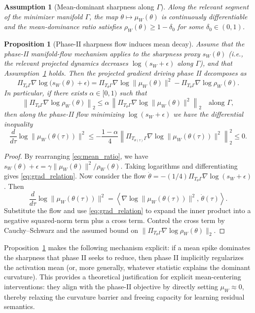 \documentclass[11pt]{article}
\newtheorem{assumption}{Assumption}
\newtheorem{proposition}{Proposition}
\begin{document}
\begin{assumption}[Mean-dominant sharpness along $\Gamma$]\label{assum:mean_dominant_flow}
Along the relevant segment of the minimizer manifold $\Gamma$, the map $\theta\mapsto\mu_W(\theta)$ is continuously differentiable and the mean-dominance ratio satisfies $\rho_W(\theta)\ge 1-\delta_0$ for some $\delta_0\in(0,1)$.
\end{assumption}

\begin{proposition}[Phase-II sharpness flow induces mean decay]\label{prop:mean_decay}
Assume that the phase-II manifold-flow mechanism applies to the sharpness proxy $s_W(\theta)$ (i.e., the relevant projected dynamics decreases $\log(s_W+\epsilon)$ along $\Gamma$), and that Assumption~\ref{assum:mean_dominant_flow} holds.
Then the projected gradient driving phase II decomposes as
\begin{equation}\label{eq:grad_relation}
\Pi_{T_\theta\Gamma}\nabla\log\bigl(s_W(\theta)+\epsilon\bigr)
=
\Pi_{T_\theta\Gamma}\nabla\log\|\mu_W(\theta)\|^2
-
\Pi_{T_\theta\Gamma}\nabla\log\rho_W(\theta).
\end{equation}
In particular, if there exists $\alpha\in[0,1)$ such that
\[
\left\|\Pi_{T_\theta\Gamma}\nabla\log\rho_W(\theta)\right\|_2
\le
\alpha\,\left\|\Pi_{T_\theta\Gamma}\nabla\log\|\mu_W(\theta)\|^2\right\|_2
\quad\text{along }\Gamma,
\]
then along the phase-II flow minimizing $\log(s_W+\epsilon)$ we have the differential inequality
\[
\frac{d}{d\tau}\log\|\mu_W(\theta(\tau))\|^2
\le
-\frac{1-\alpha}{4}\left\|\Pi_{T_{\theta(\tau)}\Gamma}\nabla\log\|\mu_W(\theta(\tau))\|^2\right\|_2^2
\le 0.
\]
\end{proposition}

\begin{proof}
By rearranging \eqref{eq:mean_ratio}, we have $s_W(\theta)+\epsilon=\gamma\|\mu_W(\theta)\|^2/\rho_W(\theta)$.
Taking logarithms and differentiating gives \eqref{eq:grad_relation}. Now consider the flow
$\dot\theta=-(1/4)\Pi_{T_\theta\Gamma}\nabla\log(s_W+\epsilon)$. Then
\[
\frac{d}{d\tau}\log\|\mu_W(\theta(\tau))\|^2
=
\left\langle \nabla\log\|\mu_W(\theta(\tau))\|^2,\,\dot\theta(\tau)\right\rangle.
\]
Substitute the flow and use \eqref{eq:grad_relation} to expand the inner product into a negative squared-norm term plus a cross term.
Control the cross term by Cauchy--Schwarz and the assumed bound on $\|\Pi_{T_\theta\Gamma}\nabla\log\rho_W(\theta)\|_2$.
\end{proof}

Proposition~\ref{prop:mean_decay} makes the following mechanism explicit: if a mean spike dominates the sharpness that phase II seeks to reduce, then phase II implicitly regularizes the activation mean (or, more generally, whatever statistic explains the dominant curvature).
This provides a theoretical justification for explicit mean-centering interventions: they align with the phase-II objective by directly setting $\mu_W\approx 0$, thereby relaxing the curvature barrier and freeing capacity for learning residual semantics.
\end{document}
